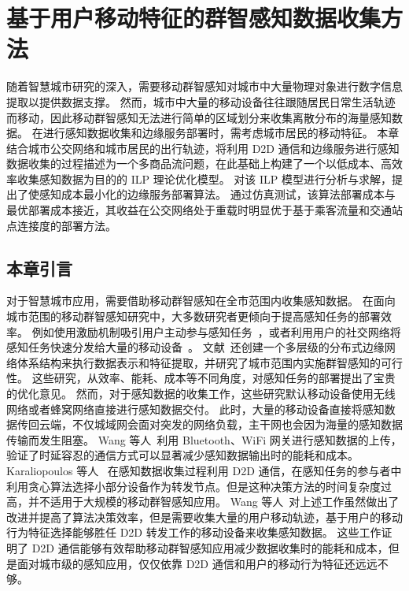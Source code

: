 \chapter{基于用户移动特征的群智感知数据收集方法}

随着智慧城市研究的深入，需要移动群智感知对城市中大量物理对象进行数字信息提取以提供数据支撑。
然而，城市中大量的移动设备往往跟随居民日常生活轨迹而移动，因此移动群智感知无法进行简单的区域划分来收集离散分布的海量感知数据。
在进行感知数据收集和边缘服务部署时，需考虑城市居民的移动特征。
本章结合城市公交网络和城市居民的出行轨迹，将利用 D2D 通信和边缘服务进行感知数据收集的过程描述为一个多商品流问题，在此基础上构建了一个以低成本、高效率收集感知数据为目的的 ILP 理论优化模型。
对该 ILP 模型进行分析与求解，提出了使感知成本最小化的边缘服务部署算法。
通过仿真测试，该算法部署成本与最优部署成本接近，其收益在公交网络处于重载时明显优于基于乘客流量和交通站点连接度的部署方法。

\section{本章引言}

对于智慧城市应用，需要借助移动群智感知在全市范围内收集感知数据。
在面向城市范围的移动群智感知研究中，大多数研究者更倾向于提高感知任务的部署效率。
例如使用激励机制吸引用户主动参与感知任务~\cite{CNKI:JiaChaopeng, CNKI:WuMCSIncentive, jiyubianyuanjisuangongyecaiji}，或者利用用户的社交网络将感知任务快速分发给大量的移动设备~\cite{Cnki:Yu2018}。
文献~还创建一个多层级的分布式边缘网络体系结构来执行数据表示和特征提取，并研究了城市范围内实施群智感知的可行性。
这些研究，从效率、能耗、成本等不同角度，对感知任务的部署提出了宝贵的优化意见。
然而，对于感知数据的收集工作，这些研究默认移动设备使用无线网络或者蜂窝网络直接进行感知数据交付。
此时，大量的移动设备直接将感知数据传回云端，不仅城域网会面对突发的网络负载，主干网也会因为海量的感知数据传输而发生阻塞。
Wang 等人~\cite{DBLP:conf/huc/WangZX13}利用 Bluetooth、WiFi 网关进行感知数据的上传，验证了时延容忍的通信方式可以显著减少感知数据输出时的能耗和成本。
Karaliopoulos 等人~\cite{DBLP:conf/infocom/KaraliopoulosTK15} 在感知数据收集过程利用 D2D 通信，在感知任务的参与者中利用贪心算法选择小部分设备作为转发节点。但是这种决策方法的时间复杂度过高，并不适用于大规模的移动群智感知应用。
Wang 等人~\cite{DBLP:journals/puc/WangLL17}对上述工作虽然做出了改进并提高了算法决策效率，但是需要收集大量的用户移动轨迹，基于用户的移动行为特征选择能够胜任 D2D 转发工作的移动设备来收集感知数据。
这些工作证明了 D2D 通信能够有效帮助移动群智感知应用减少数据收集时的能耗和成本，但是面对城市级的感知应用，仅仅依靠 D2D 通信和用户的移动行为特征还远远不够。

